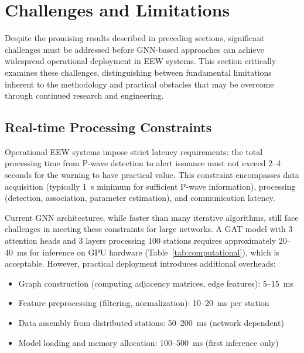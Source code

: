 \documentclass[review,authoryear]{elsarticle}
\begin{document}
\section{Challenges and Limitations}
\label{sec:challenges}

Despite the promising results described in preceding sections, significant challenges must be addressed before GNN-based approaches can achieve widespread operational deployment in EEW systems. This section critically examines these challenges, distinguishing between fundamental limitations inherent to the methodology and practical obstacles that may be overcome through continued research and engineering.

\subsection{Real-time Processing Constraints}

Operational EEW systems impose strict latency requirements: the total processing time from P-wave detection to alert issuance must not exceed 2--4 seconds for the warning to have practical value. This constraint encompasses data acquisition (typically 1~s minimum for sufficient P-wave information), processing (detection, association, parameter estimation), and communication latency.

Current GNN architectures, while faster than many iterative algorithms, still face challenges in meeting these constraints for large networks. A GAT model with 3 attention heads and 3 layers processing 100 stations requires approximately 20--40~ms for inference on GPU hardware (Table~\ref{tab:computational}), which is acceptable. However, practical deployment introduces additional overheads:

\begin{itemize}
  \item Graph construction (computing adjacency matrices, edge features): 5--15~ms
  \item Feature preprocessing (filtering, normalization): 10--20~ms per station
  \item Data assembly from distributed stations: 50--200~ms (network dependent)
  \item Model loading and memory allocation: 100--500~ms (first inference only)
\end{itemize}
\end{document}
